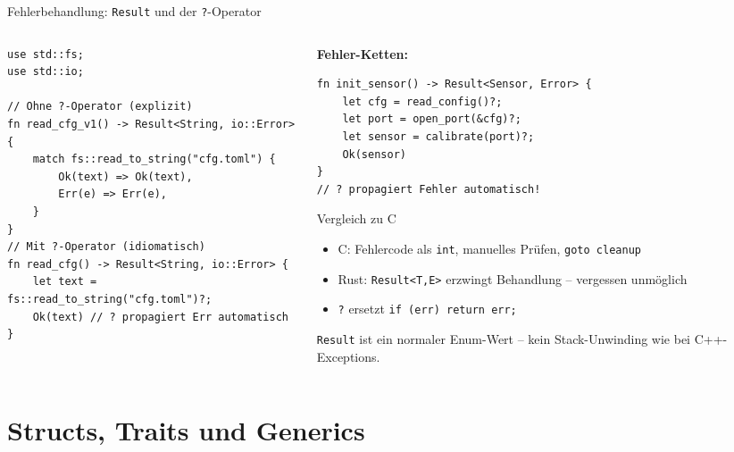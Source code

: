 \documentclass[%
  aspectratio=169,
  10pt
]{beamer}
\begin{document}
\begin{frame}[fragile]{Fehlerbehandlung: \texttt{Result} und der \texttt{?}-Operator}
  \begin{columns}[T]
    \begin{column}{0.50\textwidth}
\begin{lstlisting}
use std::fs;
use std::io;

// Ohne ?-Operator (explizit)
fn read_cfg_v1() -> Result<String, io::Error> {
    match fs::read_to_string("cfg.toml") {
        Ok(text) => Ok(text),
        Err(e) => Err(e),
    }
}
// Mit ?-Operator (idiomatisch)
fn read_cfg() -> Result<String, io::Error> {
    let text = fs::read_to_string("cfg.toml")?;
    Ok(text) // ? propagiert Err automatisch
}
\end{lstlisting}
    \end{column}
    \begin{column}{0.47\textwidth}
      \textbf{Fehler-Ketten:}
\begin{lstlisting}
fn init_sensor() -> Result<Sensor, Error> {
    let cfg = read_config()?;
    let port = open_port(&cfg)?;
    let sensor = calibrate(port)?;
    Ok(sensor)
}
// ? propagiert Fehler automatisch!
\end{lstlisting}
      \begin{block}{Vergleich zu C}
        \small
        \begin{itemize}
          \item C: Fehlercode als \texttt{int},
                manuelles Prüfen, \texttt{goto cleanup}
          \item Rust: \texttt{Result<T,E>} erzwingt
                Behandlung -- vergessen unmöglich
          \item \texttt{?} ersetzt \texttt{if (err) return err;}
        \end{itemize}
      \end{block}
      {\small \texttt{Result} ist ein normaler Enum-Wert --
      kein Stack-Unwinding wie bei C++-Exceptions.}
    \end{column}
  \end{columns}
\end{frame}

\section{Structs, Traits und Generics}
\end{document}
